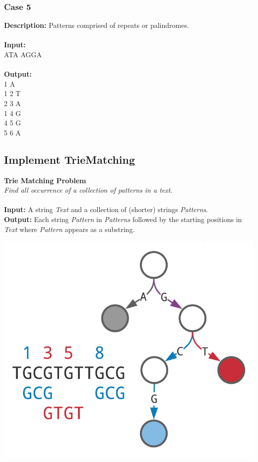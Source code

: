 \documentclass{article}
\newcommand{\code}[1]{{\fontfamily{pcr}\selectfont #1}}
\begin{document}
\subsubsection*{Case 5}
\hline \vspace{5}
\textbf{Description:} Patterns comprised of repeats or palindromes.\\ \\
\noindent \textbf{Input:}\\
\code{ATA AGGA}\\ \\
\noindent \textbf{Output:}\\
\code{0 1 A\\ 1 2 T\\ 2 3 A\\ 1 4 G\\ 4 5 G\\ 5 6 A}

\pagebreak
\subsection{Implement TrieMatching}
\hline \vspace{5}
\textbf{Trie Matching Problem}\\
\emph{Find all occurrence of a collection of patterns in a text}.\\ \\
\textbf{Input:} A string \emph{Text} and a collection of (shorter) strings \emph{Patterns}.\\
\textbf{Output:} Each string \emph{Pattern} in \emph{Patterns} followed by the starting positions in \emph{Text} where \emph{Pattern} appears as a substring.
\begin{center}
    \includegraphics[scale=0.2]{logos/9B.png} 
\end{center}
\hline \vspace{5}
\end{document}
